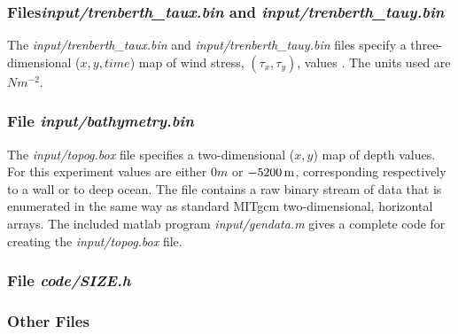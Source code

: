\subsubsection{Files{\it input/trenberth\_taux.bin} and {\it
  input/trenberth\_tauy.bin}}

The {\it input/trenberth\_taux.bin} and {\it
  input/trenberth\_tauy.bin} files specify a three-dimensional
($x,y,time$) map of wind stress, $(\tau_{x},\tau_{y})$, values
\citep{trenberth90}. The units used are $Nm^{-2}$.

\subsubsection{File {\it input/bathymetry.bin}}


The {\it input/topog.box} file specifies a two-dimensional ($x,y$)
map of depth values. For this experiment values are either
$0m$ or $-5200\,{\rm m}$, corresponding respectively to a wall or to deep
ocean. The file contains a raw binary stream of data that is enumerated
in the same way as standard MITgcm two-dimensional, horizontal arrays.
The included matlab program {\it input/gendata.m} gives a complete
code for creating the {\it input/topog.box} file.

\subsubsection{File {\it code/SIZE.h}}








\subsubsection{Other Files }

